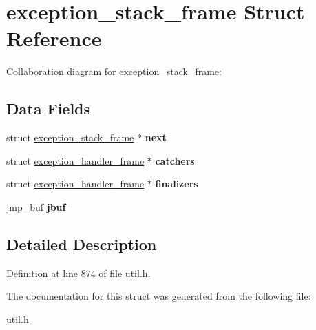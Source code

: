 \hypertarget{structexception__stack__frame}{}\section{exception\+\_\+stack\+\_\+frame Struct Reference}
\label{structexception__stack__frame}


Collaboration diagram for exception\+\_\+stack\+\_\+frame\+:
\subsection*{Data Fields}
\begin{DoxyCompactItemize}
\item 
\mbox{\label{structexception__stack__frame_abb538d9a6f6155ed83f140dd2adb7457}} 
struct \hyperlink{structexception__stack__frame}{exception\+\_\+stack\+\_\+frame} $\ast$ {\bfseries next}
\item 
\mbox{\label{structexception__stack__frame_a950ab78cc930f9662ff9cb7eedcfda79}} 
struct \hyperlink{structexception__handler__frame}{exception\+\_\+handler\+\_\+frame} $\ast$ {\bfseries catchers}
\item 
\mbox{\label{structexception__stack__frame_a543e62e78b4b2777e9df32ccc5feba38}} 
struct \hyperlink{structexception__handler__frame}{exception\+\_\+handler\+\_\+frame} $\ast$ {\bfseries finalizers}
\item 
\mbox{\label{structexception__stack__frame_a6f81386a697bcae78000625ee8ba02fa}} 
jmp\+\_\+buf {\bfseries jbuf}
\end{DoxyCompactItemize}


\subsection{Detailed Description}


Definition at line 874 of file util.\+h.



The documentation for this struct was generated from the following file\+:\begin{DoxyCompactItemize}
\item 
\hyperlink{util_8h}{util.\+h}\end{DoxyCompactItemize}
